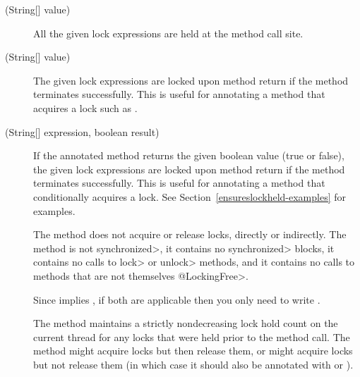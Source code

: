 \begin{sloppypar}
\begin{description}
\item[\small{(String[] value)}]
  All the given lock expressions
  are held at the method call site.

\item[\small{(String[] value)}]
  The given lock
  expressions are
  locked upon method return if the method
  terminates successfully.  This is useful for annotating a
  method that acquires a lock such as
  .

\item[\small{(String[] expression, boolean result)}]
  If the annotated method returns the given
  boolean value (true or false), the given lock
  expressions are locked upon method return if the method
  terminates successfully.
  This is useful for annotating a
  method that conditionally acquires a lock.
  See Section~\ref{ensureslockheld-examples} for examples.

\end{description}


\begin{description}

\item[]
  The method does not acquire or release locks,
  directly or indirectly.  The method is not \<synchronized>, it contains
  no \<synchronized> blocks, it contains no calls to \<lock> or \<unlock>
  methods, and it contains no calls to methods that are not themselves \<@LockingFree>.

  Since
   implies , if both are applicable
  then you only need to write .

\item[]
  The method maintains a strictly nondecreasing lock hold count on the
  current thread for any locks that were held prior
  to the method call.  The method might acquire locks but then release
  them, or might acquire locks but not release them (in which case it should
  also be annotated with
   or
  ).


\end{description}
\end{sloppypar}
